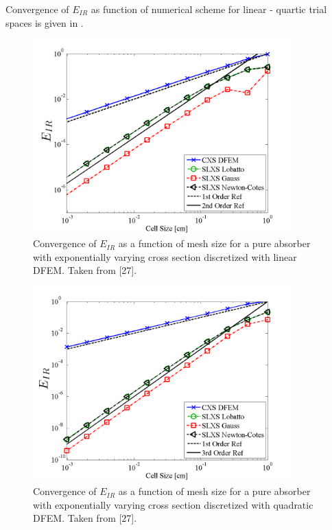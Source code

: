 Convergence of $E_{IR}$ as function of numerical scheme for linear - quartic trial spaces is given in .
%
%
\begin{figure}[!hbp]
\centering
\includegraphics[width=10cm]{chapter3_variable_xs/P1_VarXS_E_I_L2.png}
\caption{Convergence of $E_{IR}$  as a function of mesh size for a pure absorber with exponentially varying cross section discretized with linear DFEM.  Taken from [27].}
\label{fig:varxs_I_L2_p1}
\end{figure}
%
%
\begin{figure}[!htp]
\centering
\includegraphics[width=10cm]{chapter3_variable_xs/P2_VarXS_E_I_L2.png}
\caption{Convergence of $E_{IR}$  as a function of mesh size for a pure absorber with exponentially varying cross section discretized with quadratic DFEM.  Taken from [27].}
\label{fig:varxs_I_L2_p2}
\end{figure}
%
%
